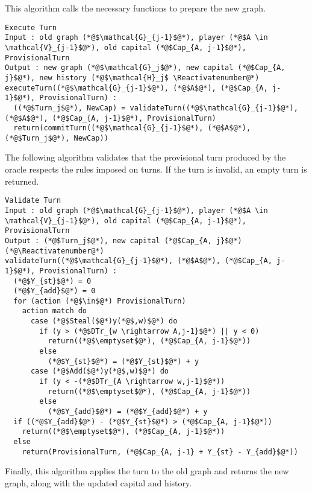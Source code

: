\documentclass[11pt]{llncs}
\makeatletter
\newcommand*\Suppressnumber{%
  \lst@AddToHook{OnNewLine}{%
    \let\thelstnumber\relax%
     \advance\c@lstnumber-\@ne\relax%
    }%
}
\theoremstyle{definition}
\makeatother
\begin{document}
    This algorithm calls the necessary functions to prepare the new graph.
    \Suppressnumber
    \begin{lstlisting}[label=executeturn, style=numbers]
Execute Turn
Input : old graph (*@$\mathcal{G}_{j-1}$@*), player (*@$A \in \mathcal{V}_{j-1}$@*), old capital (*@$Cap_{A, j-1}$@*), ProvisionalTurn
Output : new graph (*@$\mathcal{G}_j$@*), new capital (*@$Cap_{A, j}$@*), new history (*@$\mathcal{H}_j$ \Reactivatenumber@*)
executeTurn((*@$\mathcal{G}_{j-1}$@*), (*@$A$@*), (*@$Cap_{A, j-1}$@*), ProvisionalTurn) :
  ((*@$Turn_j$@*), NewCap) = validateTurn((*@$\mathcal{G}_{j-1}$@*), (*@$A$@*), (*@$Cap_{A, j-1}$@*), ProvisionalTurn)
  return(commitTurn((*@$\mathcal{G}_{j-1}$@*), (*@$A$@*), (*@$Turn_j$@*), NewCap))
    \end{lstlisting}
    The following algorithm validates that the provisional turn produced by the oracle respects the rules imposed on turns.
    If the turn is invalid, an empty turn is returned.
    \Suppressnumber
    \begin{lstlisting}[label=validateturn, style=numbers]
Validate Turn
Input : old graph (*@$\mathcal{G}_{j-1}$@*), player (*@$A \in \mathcal{V}_{j-1}$@*), old capital (*@$Cap_{A, j-1}$@*), ProvisionalTurn
Output : (*@$Turn_j$@*), new capital (*@$Cap_{A, j}$@*) (*@\Reactivatenumber@*)
validateTurn((*@$\mathcal{G}_{j-1}$@*), (*@$A$@*), (*@$Cap_{A, j-1}$@*), ProvisionalTurn) :
  (*@$Y_{st}$@*) = 0
  (*@$Y_{add}$@*) = 0
  for (action (*@$\in$@*) ProvisionalTurn)
    action match do
      case (*@$Steal($@*)y(*@$,w)$@*) do
        if (y > (*@$DTr_{w \rightarrow A,j-1}$@*) || y < 0)
          return((*@$\emptyset$@*), (*@$Cap_{A, j-1}$@*))
        else
          (*@$Y_{st}$@*) = (*@$Y_{st}$@*) + y
      case (*@$Add($@*)y(*@$,w)$@*) do
        if (y < -(*@$DTr_{A \rightarrow w,j-1}$@*))
          return((*@$\emptyset$@*), (*@$Cap_{A, j-1}$@*))
        else
          (*@$Y_{add}$@*) = (*@$Y_{add}$@*) + y
  if ((*@$Y_{add}$@*) - (*@$Y_{st}$@*) > (*@$Cap_{A, j-1}$@*))
    return((*@$\emptyset$@*), (*@$Cap_{A, j-1}$@*))
  else
    return(ProvisionalTurn, (*@$Cap_{A, j-1} + Y_{st} - Y_{add}$@*))
    \end{lstlisting}
    Finally, this algorithm applies the turn to the old graph and returns the new graph, along with the updated capital and
    history.
    \Suppressnumber
\end{document}
